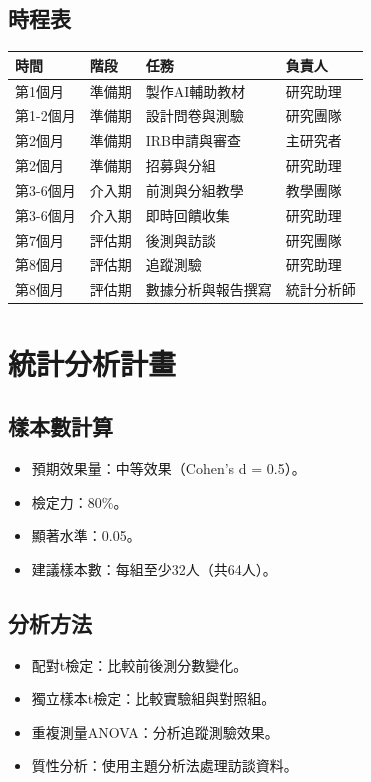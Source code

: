 \documentclass[12pt]{article}
\begin{document}
\subsection{時程表}
\begin{longtable}{p{2cm} p{4cm} p{4cm} p{4cm}}
    \toprule
    \textbf{時間} & \textbf{階段} & \textbf{任務} & \textbf{負責人} \\
    \midrule
    第1個月 & 準備期 & 製作AI輔助教材 & 研究助理 \\
    第1-2個月 & 準備期 & 設計問卷與測驗 & 研究團隊 \\
    第2個月 & 準備期 & IRB申請與審查 & 主研究者 \\
    第2個月 & 準備期 & 招募與分組 & 研究助理 \\
    第3-6個月 & 介入期 & 前測與分組教學 & 教學團隊 \\
    第3-6個月 & 介入期 & 即時回饋收集 & 研究助理 \\
    第7個月 & 評估期 & 後測與訪談 & 研究團隊 \\
    第8個月 & 評估期 & 追蹤測驗 & 研究助理 \\
    第8個月 & 評估期 & 數據分析與報告撰寫 & 統計分析師 \\
    \bottomrule
\end{longtable}

\section{統計分析計畫}
\subsection{樣本數計算}
\begin{itemize}
    \item 預期效果量：中等效果（Cohen's d = 0.5）。
    \item 檢定力：80\%。
    \item 顯著水準：0.05。
    \item 建議樣本數：每組至少32人（共64人）。
\end{itemize}

\subsection{分析方法}
\begin{itemize}
    \item 配對t檢定：比較前後測分數變化。
    \item 獨立樣本t檢定：比較實驗組與對照組。
    \item 重複測量ANOVA：分析追蹤測驗效果。
    \item 質性分析：使用主題分析法處理訪談資料。
\end{itemize}
\end{document}

